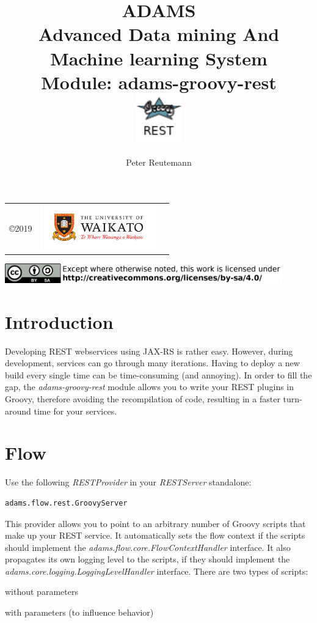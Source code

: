 \documentclass[a4paper]{book}
\title{
  \textbf{ADAMS} \\
  {\Large \textbf{A}dvanced \textbf{D}ata mining \textbf{A}nd \textbf{M}achine
  learning \textbf{S}ystem} \\
  {\Large Module: adams-groovy-rest} \\
  \vspace{1cm}
  \includegraphics[width=2cm]{images/groovy-rest-module.png} \\
}
\author{
  Peter Reutemann
}
\begin{document}
\begin{titlepage}
\maketitle

\thispagestyle{empty}
\center
\begin{table}[b]
	\begin{tabular}{c l l}
		\parbox[c][2cm]{2cm}{\copyright 2019} &
		\parbox[c][2cm]{5cm}{\includegraphics[width=5cm]{images/coat_of_arms.pdf}} \\
	\end{tabular}
	\includegraphics[width=12cm]{images/cc.png} \\
\end{table}

\end{titlepage}

\tableofcontents

\chapter{Introduction}
Developing REST webservices using JAX-RS\cite{jax-rs} is rather easy. However,
during development, services can go through many iterations. Having to deploy
a new build every single time can be time-consuming (and annoying).
In order to fill the gap, the \textit{adams-groovy-rest} module allows you
to write your REST plugins in Groovy\cite{groovy}, therefore avoiding the
recompilation of code, resulting in a faster turn-around time for your services.

\chapter{Flow}
Use the following \textit{RESTProvider} in your \textit{RESTServer} standalone:
\begin{verbatim}
adams.flow.rest.GroovyServer
\end{verbatim}
\noindent This provider allows you to point to an arbitrary number of Groovy
scripts that make up your REST service. It automatically sets the flow context
if the scripts should implement the \textit{adams.flow.core.FlowContextHandler}
interface. It also propagates its own logging level to the scripts, if they
should implement the \textit{adams.core.logging.LoggingLevelHandler} interface.
There are two types of scripts:
\begin{tight_itemize}
  \item without parameters
  \item with parameters (to influence behavior)
\end{tight_itemize}
\end{document}
